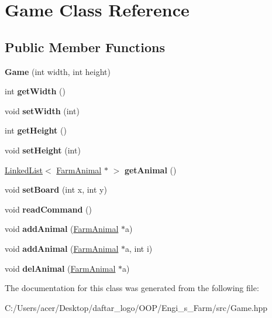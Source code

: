 \hypertarget{class_game}{}\section{Game Class Reference}
\label{class_game}
\subsection*{Public Member Functions}
\begin{DoxyCompactItemize}
\item 
\mbox{\label{class_game_a5bc07cf8947858f32637943836cc6f8e}} 
{\bfseries Game} (int width, int height)
\item 
\mbox{\label{class_game_a009fd047c0faeeeb5c57e4d5e93208ac}} 
int {\bfseries get\+Width} ()
\item 
\mbox{\label{class_game_ae8d9f47d7430b57593eb379093161746}} 
void {\bfseries set\+Width} (int)
\item 
\mbox{\label{class_game_ab6d48e5ef16d80cb52e220fc2860e62a}} 
int {\bfseries get\+Height} ()
\item 
\mbox{\label{class_game_a426be250c4f87d0059d754c10c425685}} 
void {\bfseries set\+Height} (int)
\item 
\mbox{\label{class_game_ab722677cf9309ce20779c651761cf6e3}} 
\mbox{\hyperlink{class_linked_list}{Linked\+List}}$<$ \mbox{\hyperlink{class_farm_animal}{Farm\+Animal}} $\ast$ $>$ {\bfseries get\+Animal} ()
\item 
\mbox{\label{class_game_a175171dbbb95c5c5fc365996c26e3f06}} 
void {\bfseries set\+Board} (int x, int y)
\item 
\mbox{\label{class_game_ae78f1785acba55f71c396e0539aebc4c}} 
void {\bfseries read\+Command} ()
\item 
\mbox{\label{class_game_aa3b011db0dc827b5b0311a20a6b281ce}} 
void {\bfseries add\+Animal} (\mbox{\hyperlink{class_farm_animal}{Farm\+Animal}} $\ast$a)
\item 
\mbox{\label{class_game_a8f079478b960bedae593df464986d6ae}} 
void {\bfseries add\+Animal} (\mbox{\hyperlink{class_farm_animal}{Farm\+Animal}} $\ast$a, int i)
\item 
\mbox{\label{class_game_a38f5c1e96f8d67dbe93e5a7c4578f089}} 
void {\bfseries del\+Animal} (\mbox{\hyperlink{class_farm_animal}{Farm\+Animal}} $\ast$a)
\end{DoxyCompactItemize}


The documentation for this class was generated from the following file\+:\begin{DoxyCompactItemize}
\item 
C\+:/\+Users/acer/\+Desktop/daftar\+\_\+logo/\+O\+O\+P/\+Engi\+\_\+s\+\_\+\+Farm/src/Game.\+hpp\end{DoxyCompactItemize}
